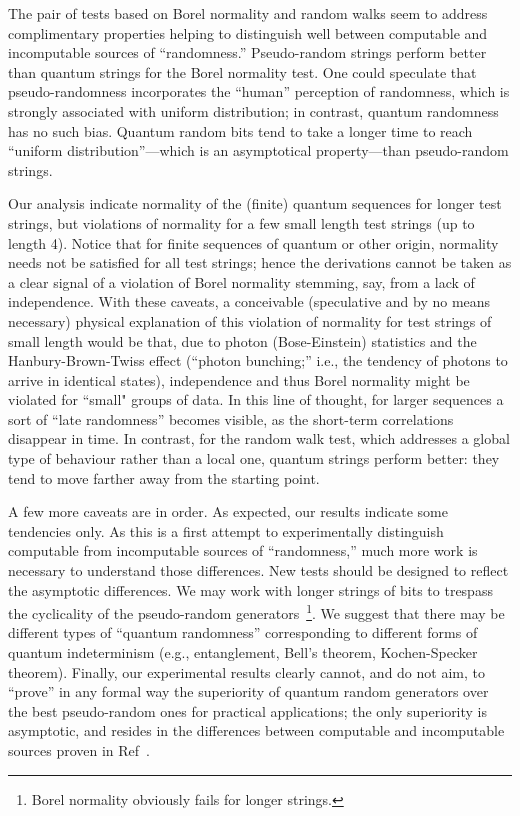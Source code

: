 \documentclass[%
 preprint,
 showpacs,
 showkeys,
 preprintnumbers,
 amsmath,amssymb,
 aps,
 prl,
  longbibliography,
 ]{revtex4-1}
\begin{document}
 The pair of tests based on Borel normality and random walks seem to address complimentary properties helping to distinguish well between
 computable and incomputable sources of ``randomness.''
Pseudo-random strings perform better  than quantum strings for the Borel normality test.
 One could speculate that pseudo-randomness incorporates
the ``human'' perception of randomness, which is strongly associated with uniform distribution;
in contrast, quantum randomness has no such bias.
Quantum random bits  tend to take a longer time to reach
``uniform distribution''---which is an asymptotical property---than pseudo-random strings.


Our analysis indicate normality of the (finite) quantum sequences for longer test strings,
but violations of normality for a few small length test strings (up to length 4).
Notice that for finite sequences of quantum or other origin,
normality needs not be satisfied for all test strings;
hence the derivations cannot be taken as a clear signal of a violation of Borel normality
stemming, say, from a lack of independence.
With these caveats, a conceivable (speculative and  by no means necessary) physical explanation of this violation of normality
for test strings of small length would be that, due to photon
(Bose-Einstein) statistics and the Hanbury-Brown-Twiss effect
(``photon bunching;'' i.e., the tendency of photons to arrive in identical states), independence and thus Borel
normality might be violated for ``small" groups of data.
In this line of thought,  for larger sequences a sort of ``late randomness'' becomes visible,
as the short-term correlations disappear in time.
In contrast, for the random walk test, which addresses a global type of behaviour rather than
a local one, quantum strings perform better: they tend to  move farther away from the starting point.



A few more caveats are in order.
As expected, our results indicate some tendencies only.  As this is a first attempt to experimentally distinguish computable from incomputable sources
of ``randomness,'' much more work is necessary to understand those differences.
  New tests should be designed to reflect the asymptotic differences. We may work with  longer strings of bits to trespass the
cyclicality of the pseudo-random generators~\footnote{Borel normality obviously  fails for
longer strings.}. We suggest that there may be different types of ``quantum randomness''
corresponding to different forms of quantum indeterminism (e.g.,
entanglement, Bell's theorem, Kochen-Specker theorem).
Finally, our experimental results clearly cannot, and do not aim, to ``prove'' in any formal way  the
superiority of quantum random generators over the best pseudo-random ones for practical applications;
the only superiority is asymptotic, and resides in the differences between computable and incomputable sources proven in Ref~\cite{2008-cal-svo}.
\end{document}
